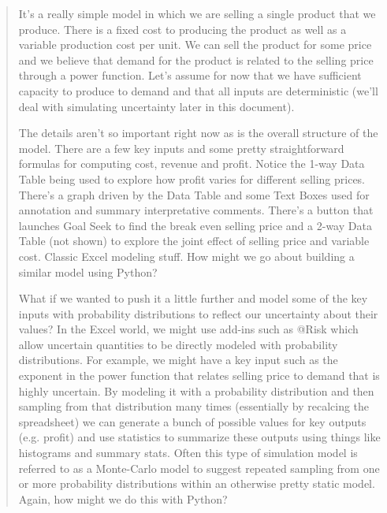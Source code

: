 \documentclass[ited,blindrev]{informs3}              %
\begin{document}
\begin{tcolorbox}[boxrule=1pt,sharp corners]
\begin{quotation}
\textsf{	
	It's a really simple model in which we are selling a single product that we produce. There is a fixed cost to producing the product as well as a variable production cost per unit. We can sell the product for some price and we believe that demand for the product is related to the selling price through a power function. Let's assume for now that we have sufficient capacity to produce to demand and that all inputs are deterministic (we'll deal with simulating uncertainty later in this document).}
	
	\textsf{The details aren't so important right now as is the overall structure of the model. There are a few key inputs and some pretty straightforward formulas for computing cost, revenue and profit. Notice the 1-way Data Table being used to explore how profit varies for different selling prices. There's a graph driven by the Data Table and some Text Boxes used for annotation and summary interpretative comments. There's a button that launches Goal Seek to find the break even selling price and a 2-way Data Table (not shown) to explore the joint effect of selling price and variable cost. Classic Excel modeling stuff. How might we go about building a similar model using Python? } 
	
	\textsf{What if we wanted to push it a little further and model some of the key inputs with probability distributions to reflect our uncertainty about their values? In the Excel world, we might use add-ins such as @Risk which allow uncertain quantities to be directly modeled with probability distributions. For example, we might have a key input such as the exponent in the power function that relates selling price to demand that is highly uncertain. By modeling it with a probability distribution and then sampling from that distribution many times (essentially by recalcing the spreadsheet) we can generate a bunch of possible values for key outputs (e.g. profit) and use statistics to summarize these outputs using things like histograms and summary stats. Often this type of simulation model is referred to as a Monte-Carlo model to suggest repeated sampling from one or more probability distributions within an otherwise pretty static model. Again, how might we do this with Python?}
\end{quotation}
\end{tcolorbox}
\end{document}
